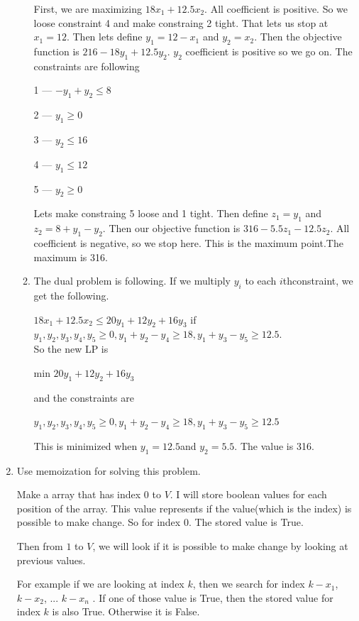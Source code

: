 \documentclass[a4paper,11pt]{article}
\begin{document}
\begin{enumerate}
\begin{enumerate}
First, we are maximizing $18x_1 + 12.5x_2$. All coefficient is positive. So we loose constraint 4 and make constraing 2 tight. That lets us stop at $x_1 = 12$.
Then lets define $y_1 = 12 - x_1$ and $y_2 = x_2$. Then the objective function is $216-18y_1+12.5y_2$. $y_2$ coefficient is positive so we go on. The constraints are following

1 --- $-y_1 + y_2 \leq 8$

2 --- $y_1 \geq 0$

3 --- $y_2 \leq 16$

4 --- $y_1 \leq 12$

5 --- $y_2 \geq 0$

Lets make constraing 5 loose and 1 tight.
Then define $z_1 = y_1$ and $z_2 = 8 + y_1 -y_2$.
Then our objective function is $316 - 5.5z_1 - 12.5z_2$.
All coefficient is negative, so we stop here. This is the maximum point.The maximum is 316.

\item

The dual problem is following. If we multiply $y_i$ to each $i$thconstraint, we get the following.

$18x_1 + 12.5x_2 \leq 20y_1+12y_2+16y_3$ if $y_1,y_2,y_3,y_4,y_5 \geq 0, y_1+y_2-y_4 \geq 18, y_1 + y_3 - y_5 \geq 12.5$.
\\


So the new LP is 


min $20y_1+12y_2+16y_3$

and the constraints are

 $y_1,y_2,y_3,y_4,y_5 \geq 0, y_1+y_2-y_4 \geq 18, y_1 + y_3 - y_5 \geq 12.5$

This is minimized when $y_1 = 12.5$and $y_2 = 5.5$. The value is 316.
\end{enumerate}


\item 

Use memoization for solving this problem.

Make a array that has index $0$ to $V$.
I will store boolean values for each position of the array.
This value represents if the value(which is the index) is possible to make change. So for index $0$. The stored value is True.

Then from $1$ to $V$, we will look if it is possible to make change by looking at previous values.

For example if we are looking at index $k$, then we search for index $k-x_1$, $k-x_2$, ... $k-x_n$ . If one of those value is True, then the stored value for index $k$ is also True. Otherwise it is False.


\end{enumerate}
\end{document}
